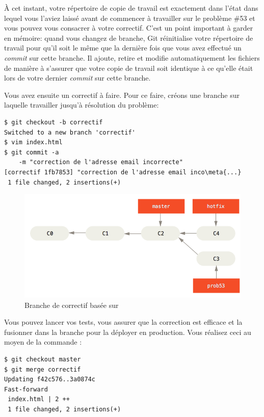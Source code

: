 À cet instant, votre répertoire de copie de travail est exactement dans l'état dans lequel vous l'aviez laissé avant de commencer à travailler sur le problème \#53 et vous pouvez vous consacrer à votre correctif.
C'est un point important à garder en mémoire: quand vous changez de branche, Git réinitialise votre répertoire de travail pour qu'il soit le même que la dernière fois que vous avez effectué un \emph{commit} sur cette branche.
Il ajoute, retire et modifie automatiquement les fichiers de manière à s'assurer que votre copie de travail soit identique à ce qu'elle était lors de votre dernier \emph{commit} sur cette branche.

Vous avez ensuite un correctif à faire.
Pour ce faire, créons une branche  sur laquelle travailler jusqu'à résolution du problème:
\begin{Schunk}
\begin{Verbatim}[commandchars=\\\{\}]
$ git checkout -b correctif
Switched to a new branch 'correctif'
$ vim index.html
$ git commit -a
    -m "correction de l'adresse email incorrecte"
[correctif 1fb7853] "correction de l'adresse email inco\meta{...}
 1 file changed, 2 insertions(+)
\end{Verbatim}
\end{Schunk}

\begin{figure}[!h]
  \centering
  \includegraphics{images/basic-branching-4}
  \caption{Branche de correctif basée sur }
  \label{fig:git:basic-branching-4}
\end{figure}

Vous pouvez lancer vos tests, vous assurer que la correction est efficace et la fusionner dans la branche  pour la déployer en production.
Vous réalisez ceci au moyen de la commande :
\begin{Schunk}
\begin{Verbatim}
$ git checkout master
$ git merge correctif
Updating f42c576..3a0874c
Fast-forward
 index.html | 2 ++
 1 file changed, 2 insertions(+)
\end{Verbatim}
\end{Schunk}

